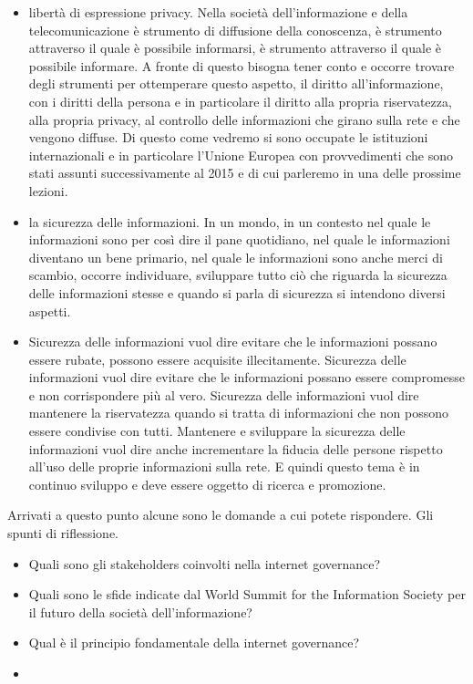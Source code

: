 \begin{itemize}
    \item libertà di espressione privacy. Nella società dell'informazione e della telecomunicazione è strumento di diffusione della conoscenza, è strumento attraverso il quale è possibile informarsi, è strumento attraverso il quale è possibile informare. A fronte di questo bisogna tener conto e occorre trovare degli strumenti per ottemperare questo aspetto, il diritto all'informazione, con i diritti della persona e in particolare il diritto alla propria riservatezza, alla propria privacy, al controllo delle informazioni che girano sulla rete e che vengono diffuse. Di questo come vedremo si sono occupate le istituzioni internazionali e in particolare l'Unione Europea con provvedimenti che sono stati assunti successivamente al 2015 e di cui parleremo in una delle prossime lezioni.
    \item la sicurezza delle informazioni. In un mondo, in un contesto nel quale le informazioni sono per così dire il pane quotidiano, nel quale le informazioni diventano un bene primario, nel quale le informazioni sono anche merci di scambio, occorre individuare, sviluppare tutto ciò che riguarda la sicurezza delle informazioni stesse e quando si parla di sicurezza si intendono diversi aspetti.
    \item  Sicurezza delle informazioni vuol dire evitare che le informazioni possano essere rubate, possono essere acquisite illecitamente. Sicurezza delle informazioni vuol dire evitare che le informazioni possano essere compromesse e non corrispondere più al vero. Sicurezza delle informazioni vuol dire mantenere la riservatezza quando si tratta di informazioni che non possono essere condivise con tutti. Mantenere e sviluppare la sicurezza delle informazioni vuol dire anche incrementare la fiducia delle persone rispetto all'uso delle proprie informazioni sulla rete. E quindi questo tema è in continuo sviluppo e deve essere oggetto di ricerca e promozione.
\end{itemize}


Arrivati a questo punto alcune sono le domande a cui potete rispondere. Gli spunti di riflessione.
\begin{itemize}
    \item Quali sono gli stakeholders coinvolti nella internet governance?
    \item Quali sono le sfide indicate dal World Summit for the Information Society per il futuro della società dell'informazione?
    \item Qual è il principio fondamentale della internet governance?
    \item
\end{itemize}
